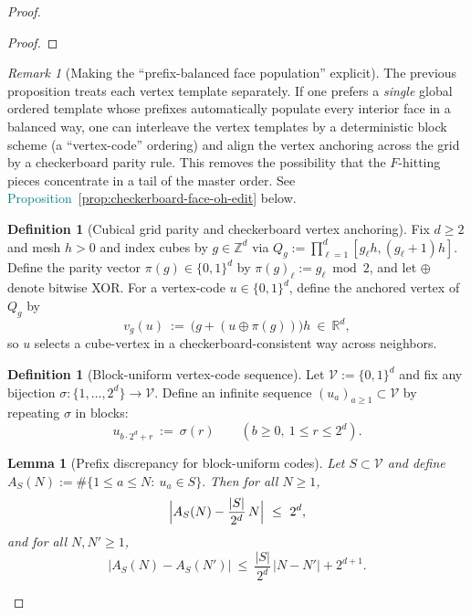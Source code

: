 \documentclass[11pt]{article}
\newcommand{\REVMZ}[1]{\textcolor{teal}{#1}}  %
\numberwithin{equation}{section}  %
\theoremstyle{plain}
\newtheorem{lemma}[theorem]{Lemma}
\theoremstyle{definition}
\newtheorem{definition}[theorem]{Definition}
\theoremstyle{remark}
\newtheorem{remark}[theorem]{Remark}
\newcommand{\R}{\mathbb{R}}
\newcommand{\Z}{\mathbb{Z}}
\begin{document}
\begin{proof}
\begin{proof}
\end{proof}

\begin{remark}[Making the ``prefix-balanced face population'' explicit]
The previous proposition treats each vertex template separately.
If one prefers a \emph{single} global ordered template whose prefixes automatically populate every interior face in a balanced way, one can interleave the vertex templates
by a deterministic block scheme (a ``vertex-code'' ordering) and align the vertex anchoring across the grid by a checkerboard parity rule.
This removes the possibility that the $F$-hitting pieces concentrate in a tail of the master order.
See \REVMZ{Proposition~\ref{prop:checkerboard-face-oh-edit}} below.
\end{remark}

\begin{definition}[Cubical grid parity and checkerboard vertex anchoring]\label{def:checkerboard-anchoring}
Fix $d\ge 2$ and mesh $h>0$ and index cubes by $g\in\Z^d$ via
\(
Q_g:=\prod_{\ell=1}^d[g_\ell h,(g_\ell+1)h].
\)
Define the parity vector $\pi(g)\in\{0,1\}^d$ by $\pi(g)_\ell:=g_\ell\bmod 2$, and let $\oplus$ denote bitwise XOR.
For a vertex-code $u\in\{0,1\}^d$, define the anchored vertex of $Q_g$ by
\[
v_g(u)\ :=\ \bigl(g+(u\oplus\pi(g))\bigr)h\ \in\ \R^d,
\]
so $u$ selects a cube-vertex in a checkerboard-consistent way across neighbors.
\end{definition}

\begin{definition}[Block-uniform vertex-code sequence]\label{def:block-uniform-codes}
Let $\mathcal V:=\{0,1\}^d$ and fix any bijection $\sigma:\{1,\dots,2^d\}\to\mathcal V$.
Define an infinite sequence $(u_a)_{a\ge 1}\subset\mathcal V$ by repeating $\sigma$ in blocks:
\[
u_{b\cdot 2^d+r}\ :=\ \sigma(r)\qquad (b\ge 0,\ 1\le r\le 2^d).
\]
\end{definition}

\begin{lemma}[Prefix discrepancy for block-uniform codes]\label{lem:prefix-discrepancy}\label{lem:template-vertex-control}
Let $S\subset\mathcal V$ and define
\(
A_S(N):=\#\{1\le a\le N:\ u_a\in S\}.
\)
Then for all $N\ge 1$,
\[
\Bigl|A_S(N) - \frac{|S|}{2^d}\,N\Bigr|\ \le\ 2^d,
\]
and for all $N,N'\ge 1$,
\[
|A_S(N)-A_S(N')|\ \le\ \frac{|S|}{2^d}\,|N-N'| + 2^{d+1}.
\]
\end{lemma}



\end{proof}
\end{document}
